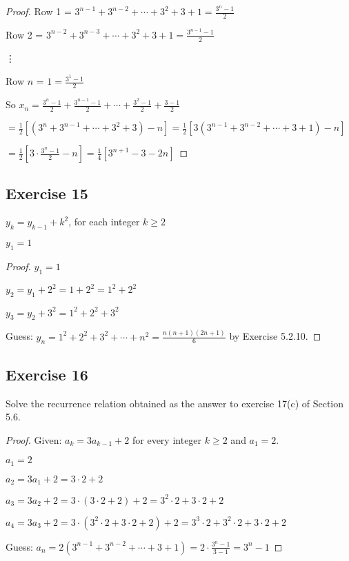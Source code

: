 \documentclass[14pt]{extarticle}
\newcommand{\dps}{\displaystyle}
\newcommand{\cy}{\color{cyan}}
\begin{document}
\begin{proof}
        Row 1 = \(3^{n-1} + 3^{n-2} + \cdots + 3^2 + 3 + 1 = \dps \frac{3^n - 1}{2}\)

        Row 2 = \(3^{n-2} + 3^{n-3} + \cdots + 3^2 + 3 + 1 = \dps \frac{3^{n-1} - 1}{2}\)

        \vdots

        Row $n$ = \(1 = \dps \frac{3^{1} - 1}{2}\)

        So \(\dps x_n = \frac{3^n - 1}{2} + \frac{3^{n-1} - 1}{2} + \cdots + \frac{3^2 - 1}{2} + \frac{3 - 1}{2}\)

        \( = \dps \frac{1}{2}\left[(3^n + 3^{n-1} + \cdots + 3^2 + 3) - n\right] = \frac{1}{2}\left[3(3^{n-1} + 3^{n-2} + \cdots + 3 + 1) - n\right]\)

        \(\dps = \frac{1}{2}\left[3 \cdot \frac{3^n - 1}{2} - n\right] = \frac{1}{4}\left[3^{n+1} - 3 - 2n\right]\)
    \end{proof}

    \subsection{Exercise 15}
    \(y_k = y_{k-1} + k^2\), for each integer \(k \geq 2\)

    \(y_1 = 1\)

    \begin{proof}
        \(y_1 = 1\)

        \(y_2 = y_1 + 2^2 = 1 + 2^2 = 1^2 + 2^2\)

        \(y_3 = y_2 + 3^2 = 1^2 + 2^2 + 3^2\)

        Guess: \(y_n = 1^2 + 2^2 + 3^2 + \cdots + n^2 = \dps \frac{n(n+1)(2n+1)}{6}\) {\cy by Exercise 5.2.10}.
    \end{proof}

    \subsection{Exercise 16}
    Solve the recurrence relation obtained as the answer to exercise 17(c) of Section 5.6.

    \begin{proof}
        Given: \(a_k = 3a_{k-1} + 2\) for every integer \(k \geq 2\) and \(a_1 = 2\).

        \(a_1 = 2\)

        \(a_2 = 3a_1 + 2 = 3 \cdot 2 + 2\)

        \(a_3 = 3a_2 + 2 = 3 \cdot (3 \cdot 2 + 2) + 2 = 3^2 \cdot 2 + 3 \cdot 2 + 2\)

        \(a_4 = 3a_3 + 2 = 3 \cdot (3^2 \cdot 2 + 3 \cdot 2 + 2) + 2 = 3^3 \cdot 2 + 3^2 \cdot 2 + 3 \cdot 2 + 2\)

        Guess: \(a_n = 2(3^{n-1} + 3^{n-2} + \cdots + 3 + 1) = \dps 2 \cdot \frac{3^n - 1}{3 - 1} = 3^n - 1\)
    \end{proof}
\end{document}
